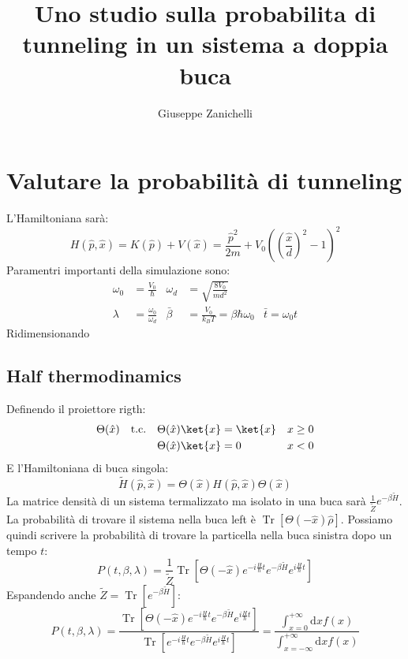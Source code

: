 \documentclass[italian]{article}
\title{Uno studio sulla probabilita di tunneling in un sistema a doppia buca}
\author{Giuseppe Zanichelli}
\newcommand{\op}{\hat{p}}
\newcommand{\ox}{\hat{x}}
\newcommand{\tc}{\quad\mathrm{t.c.}\quad}
\DeclareMathOperator{\Tr}{Tr}
\begin{document}
	\section{Valutare la probabilità di tunneling}
	L'Hamiltoniana sarà:
	\begin{equation}
		H(\op, \ox) = K(\op) + V(\ox) = \frac{\op^2}{2m} + V_0\left(\left(\frac{\ox}{d}\right)^2 - 1\right)^2
	\end{equation}
	Paramentri importanti della simulazione sono:
	\begin{align}
		\omega_0 & = \frac{V_0}{\hbar} & \omega_d & = \sqrt{\frac{8V_0}{md^2}} \\
		 \lambda &= \frac{\omega_0}{\omega_d} &
		\bar{\beta} &= \frac{V_0}{k_B T} =  \beta\hbar\omega_0&
		\bar{t} = \omega_0 t
	\end{align}
	Ridimensionando
	\subsection{Half thermodinamics}
	Definendo il proiettore rigth:
	\begin{align}
		\Theta(\ox) \tc &\Theta(\ox)\ket{x} = \ket{x} & x\ge0 \\
		&\Theta(\ox)\ket{x} = 0 & x<0
	\end{align}
	E l'Hamiltoniana di buca singola:
	\begin{equation}
		\tilde{H}(\op, \ox) = \Theta(\ox)H(\op, \ox)\Theta(\ox)
	\end{equation}
	La matrice densità di un sistema termalizzato ma isolato in una buca sarà $\frac{1}{\tilde{Z}}e^{-\beta\tilde{H}}$. La probabilità di trovare il sistema nella buca left è $\Tr\left[\Theta(-\ox)\hat{\rho}\right]$. Possiamo quindi scrivere la probabilità di trovare la particella nella buca sinistra dopo un tempo $t$:
	\begin{equation}
		P(t,\beta, \lambda) = \frac{1}{\tilde{Z}}\Tr\left[\Theta(-\ox)
		e^{-i\frac{H}{\hbar}t}
		e^{-\beta\tilde{H}}
		e^{i\frac{H}{\hbar}t}
		\right]
	\end{equation}
	Espandendo anche $\tilde{Z} = \Tr\left[e^{-\beta\tilde{H}}\right]$:
	\begin{equation}
		P(t,\beta, \lambda) = \frac{\Tr\left[\Theta(-\ox)
			e^{-i\frac{H}{\hbar}t}
			e^{-\beta\tilde{H}}
			e^{i\frac{H}{\hbar}t}
			\right]}{\Tr\left[
			e^{-i\frac{H}{\hbar}t}
			e^{-\beta\tilde{H}}
			e^{i\frac{H}{\hbar}t}
			\right]}=\frac{\int_{x=0}^{+\infty}{\mathrm{d}xf(x)}}
		{\int_{x=-\infty}^{+\infty}\mathrm{d}xf(x)}
	\end{equation}
\end{document}

